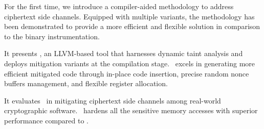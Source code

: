\begin{packed_itemize}
\item For the first time, we introduce a compiler-aided methodology to address ciphertext side channels. Equipped with multiple variants, the methodology has been demonstrated to provide a more efficient and flexible solution in comparison to the binary instrumentation.

\item It presents \tool, an LLVM-based tool that harnesses dynamic taint analysis and deploys mitigation variants at the compilation stage. \tool\ excels in generating more efficient mitigated code through in-place code insertion, precise random nonce buffers management, and flexible register allocation.

\item It evaluates \tool\ in mitigating ciphertext side channels among real-world cryptographic software. \tool\ hardens all the sensitive memory accesses with superior performance compared to \ftool.
\end{packed_itemize}
